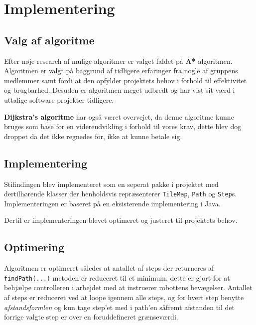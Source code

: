 \chapter{Implementering}

\section{Valg af algoritme}
Efter nøje research af mulige algoritmer er valget faldet på \textbf{A*} algoritmen.
Algoritmen er valgt på baggrund af tidligere erfaringer fra nogle af gruppens medlemmer samt fordi at den opfylder projektets behov i forhold til effektivitet og brugbarhed. Desuden er algoritmen meget udbredt og har vist sit værd i uttalige software projekter tidligere.

\textbf{Dijkstra's algoritme} har også været overvejet, da denne algoritme kunne bruges som base for en videreudvikling i forhold til vores krav, dette blev dog droppet da det ikke regnedes for, ikke at kunne betale sig.

\section{Implementering}
Stifindingen blev implementeret som en seperat pakke i projektet med dertilhørende klasser der henholdsvis repræsenterer \texttt{TileMap}, \texttt{Path} og \texttt{Step}s. Implementeringen er baseret på en eksisterende implementering i Java.\cite{astar}

Dertil er implementeringen blevet optimeret og justeret til projektets behov.

\section{Optimering}
Algoritmen er optimeret således at antallet af steps der returneres af \texttt{findPath(...)} metoden er reduceret til et minimum, dette er gjort for at behjælpe controlleren i arbejdet med at instruerer robottens bevægelser. Antallet af steps er reduceret ved at loope igennem alle steps, og for hvert step benytte \textit{afstandsformlen} og kun tage step'et med i path'en såfremt afstanden til det forrige valgte step er over en foruddefineret grænseværdi.